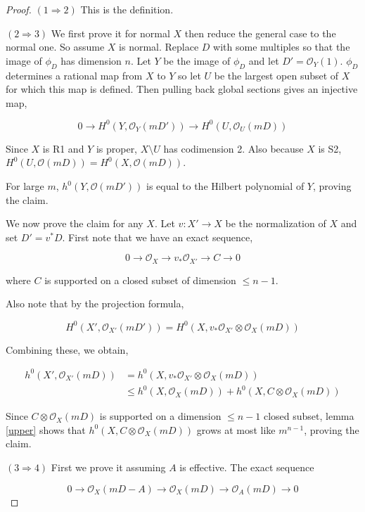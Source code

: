 \documentclass[a4paper]{article}
\numberwithin{theorem}{section}
\begin{document}
\begin{proof}
$(1 \Rightarrow 2)$ This is the definition.

$(2 \Rightarrow 3)$ We first prove it for normal $X$ then reduce the general case to the normal one. So assume $X$ is normal. Replace $D$ with some multiples so that the image of $\phi_D$ has dimension $n$. Let $Y$ be the image of $\phi_{D}$ and let $D' = \mathcal{O}_Y(1)$. $\phi_{D}$ determines a rational map from $X$ to $Y$ so let $U$ be the largest open subset of $X$ for which this map is defined. Then pulling back global sections gives an injective map,

$$ 0 \rightarrow H^0(Y, \mathcal{O}_Y(mD')) \rightarrow H^0(U, \mathcal{O}_U(mD)) $$

Since $X$ is R1 and $Y$ is proper, $X \setminus U$ has codimension 2. Also because $X$ is S2, $H^0(U, \mathcal{O}(mD)) = H^0(X, \mathcal{O}(mD))$.

For large $m$, $h^0(Y, \mathcal{O}(mD'))$ is equal to the Hilbert polynomial of $Y$, proving the claim.

We now prove the claim for any $X$. Let $v: X' \rightarrow X$ be the normalization of $X$ and set $D' = v^* D$. First note that we have an exact sequence,

$$ 0 \rightarrow \mathcal{O}_X \rightarrow v_* \mathcal{O}_{X'} \rightarrow C \rightarrow 0 $$

where $C$ is supported on a closed subset of dimension $\leq n - 1$.

Also note that by the projection formula,

$$ H^0(X', \mathcal{O}_{X'}(mD')) = H^0(X,v_* \mathcal{O}_{X'} \otimes \mathcal{O}_X(mD)) $$

Combining these, we obtain,

\begin{align*} 
h^0(X', \mathcal{O}_{X'}(mD)) &= h^0(X,v_* \mathcal{O}_{X'} \otimes \mathcal{O}_X(mD)) \\ 
&\leq  h^0(X, \mathcal{O}_X(mD)) + h^0(X,C \otimes \mathcal{O}_X(mD))
\end{align*}

Since $C \otimes \mathcal{O}_X(mD)$ is supported on a dimension $\leq n-1$ closed subset, lemma \ref{upper} shows that $h^0(X,C \otimes \mathcal{O}_X(mD))$ grows at most like $m^{n-1}$, proving the claim.

$(3 \Rightarrow 4)$ First we prove it assuming $A$ is effective. The exact sequence

$$ 0 \rightarrow \mathcal{O}_X(mD - A) \rightarrow \mathcal{O}_X(mD) \rightarrow \mathcal{O}_A(mD) \rightarrow 0 $$


\end{proof}
\end{document}
